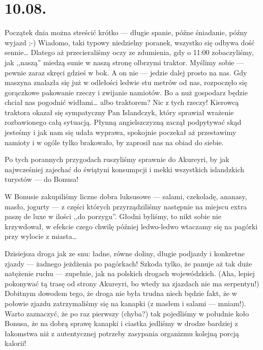 \chapter*{10.08.}

Początek dnia można streścić krótko --- długie spanie, późne śniadanie, późny wyjazd ;-) Wiadomo, taki typowy niedzielny poranek, wszystko się odbywa dość sennie… Dlatego aż przecieraliśmy oczy ze zdumienia, gdy o 11:00 zobaczyliśmy, jak ,,naszą'' miedzą sunie w naszą stronę olbrzymi traktor. Myślimy sobie --- pewnie zaraz skręci gdzieś w bok. A on nie --- jedzie dalej prosto na nas. Gdy maszyna znalazła się już w odlełości ledwie stu metrów od nas, rozpoczęło się gorączkowe pakowanie rzeczy i zwijanie namiotów. Bo a nuż gospodarz będzie chciał nas pogodnić widłami… albo traktorem? Nic z tych rzeczy! Kierowcą traktora okazał się sympatyczny Pan Islandczyk, który sprawiał wrażenie rozbawionego całą sytuacją. Płynną angielszczyzną zaczął podpytywać skąd jesteśmy i jak nam się udała wyprawa, spokojnie poczekał aż przestawimy namioty i w ogóle tylko brakowało, by zaprosił nas na obiad do siebie.

Po tych porannych przygodach ruszyliśmy sprawnie do Akureyri, by jak najwcześniej zajechać do świątyni konsumpcji i mekki wszystkich islandzkich turystów --- do Bonusa!


W Bonusie zakupiliśmy liczne dobra luksusowe --- salami, czekoladę, ananasy, masło, jogurty --- z części których przyrządziliśmy następnie na miejscu extra paszę de luxe w ilości ,,do porzygu''. Głodni byliśmy, to nikt sobie nie krzywdował, w efekcie czego chwilę później ledwo-ledwo wtaczamy się na pagórki przy wylocie z miasta…


Dzisiejsza droga jak ze snu: ładne, równe doliny, długie podjazdy i konkretne zjazdy --- żadnego jeżdżenia po pagórkach! Szkoda tylko, że panuje aż tak duże natężenie ruchu --- zupełnie, jak na polskich drogach wojewódzkich. (Aha, lepiej pokonywać tą trasę od strony Akureyri, bo wtedy na zjazdach nie ma serpentyn!) Dobitnym dowodem tego, że droga nie była trudna niech będzie fakt, że w połowie zjazdu zatrzymaliśmy się na kanapki (z masłem i salami --- mniam!). Warto zaznaczyć, że po raz pierwszy (chyba?) tak pojedliśmy w południe koło Bonusa, że na dobrą sprawę kanapki i ciastka jedliśmy w drodze bardziej z łakomstwa niż z autentycznej potrzeby zasypania organizmu kolejną porcją kalorii!

